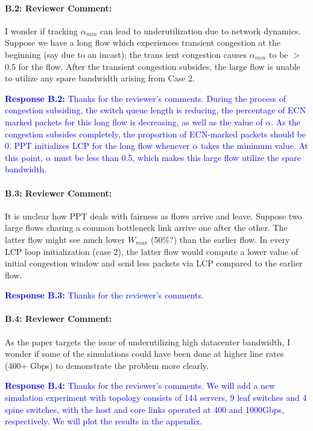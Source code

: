 \documentclass[12pt,one-column]{article}
\begin{document}
{\it \paragraph{B.2: Reviewer Comment:} I wonder if tracking $\alpha_{min}$ can lead to underutilization due to network dynamics. Suppose we have a long flow which experiences transient congestion at the beginning (say due to an incast); the trans ient congestion causes $\alpha_{min}$ to be $>$ 0.5 for the flow. After the transient congestion subsides, the large flow is unable to utilize any spare bandwidth arising from Case 2.}

\noindent\textcolor{blue}{\textbf{Response B.2:}
Thanks for the reviewer’s comments. 
During the process of congestion subsiding, the switch queue length is reducing, the percentage of ECN marked packets for this long flow is decreasing, as well as the value of $\alpha$.
As the congestion subsides completely, the proportion of ECN-marked packets should be 0.
PPT initializes LCP for the long flow whenever $\alpha$ takes the minimum value.
At this point, $\alpha$ must be less than 0.5, which makes this large flow utilize the spare bandwidth.
}

{\it \paragraph{B.3: Reviewer Comment:} It is unclear how PPT deals with fairness as flows arrive and leave. Suppose two large flows sharing a common bottleneck link arrive one after the other. The latter flow might see much lower $W_{max}$ (50\%?) than the earlier flow. In every LCP loop initialization (case 2), the latter flow would compute a lower value of initial congestion window and send less packets via LCP compared to the earlier flow.}


\noindent\textcolor{blue}{\textbf{Response B.3:}
Thanks for the reviewer’s comments. 
}

{\it \paragraph{B.4: Reviewer Comment:} As the paper targets the issue of underutilizing high datacenter bandwidth, I wonder if some of the simulations could have been done at higher line rates (400+ Gbps) to demonstrate the problem more clearly.}


\noindent\textcolor{blue}{\textbf{Response B.4:}
Thanks for the reviewer’s comments. 
We will add a new simulation experiment with topology consists of 144 servers, 9 leaf switches and 4 spine switches, with the host and core links operated at 400 and 1000Gbps, respectively.
We will plot the results in the appendix.
}
\end{document}
